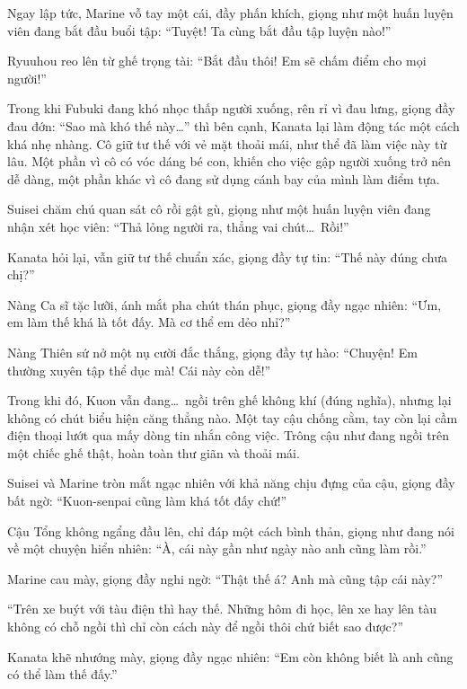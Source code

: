 \documentclass[../main.tex]{subfiles}
\begin{document}
Ngay lập tức, Marine vỗ tay một cái, đầy phấn khích, giọng như một huấn luyện viên đang bắt đầu buổi tập: ``Tuyệt! Ta cùng bắt đầu tập luyện nào!''

Ryuuhou reo lên từ ghế trọng tài: ``Bắt đầu thôi! Em sẽ chấm điểm cho mọi người!''

\ct

Trong khi Fubuki đang khó nhọc thấp người xuống, rên rỉ vì đau lưng, giọng đầy đau đớn: ``Sao mà khó thế này\dots'' thì bên cạnh, Kanata lại làm động tác một cách khá nhẹ nhàng. Cô giữ tư thế với vẻ mặt thoải mái, như thể đã làm việc này từ lâu. Một phần vì cô có vóc dáng bé con, khiến cho việc gập người xuống trở nên dễ dàng, một phần khác vì cô đang sử dụng cánh bay của mình làm điểm tựa.


Suisei chăm chú quan sát cô rồi gật gù, giọng như một huấn luyện viên đang nhận xét học viên: ``Thả lỏng người ra, thẳng vai chút\dots\ Rồi!''

Kanata hỏi lại, vẫn giữ tư thế chuẩn xác, giọng đầy tự tin: ``Thế này đúng chưa chị?''

Nàng Ca sĩ tặc lưỡi, ánh mắt pha chút thán phục, giọng đầy ngạc nhiên: ``Ưm, em làm thế khá là tốt đấy. Mà cơ thể em dẻo nhỉ?''

Nàng Thiên sứ nở một nụ cười đắc thắng, giọng đầy tự hào: ``Chuyện! Em thường xuyên tập thể dục mà! Cái này còn dễ!''

Trong khi đó, Kuon vẫn đang\dots\ ngồi trên ghế không khí (đúng nghĩa), nhưng lại không có chút biểu hiện căng thẳng nào. Một tay cậu chống cằm, tay còn lại cầm điện thoại lướt qua mấy dòng tin nhắn công việc. Trông cậu như đang ngồi trên một chiếc ghế thật, hoàn toàn thư giãn và thoải mái.

Suisei và Marine tròn mắt ngạc nhiên với khả năng chịu đựng của cậu, giọng đầy bất ngờ: ``Kuon-senpai cũng làm khá tốt đấy chứ!''

Cậu Tổng không ngẩng đầu lên, chỉ đáp một cách bình thản, giọng như đang nói về một chuyện hiển nhiên: ``À, cái này gần như ngày nào anh cũng làm rồi.''

Marine cau mày, giọng đầy nghi ngờ: ``Thật thế á? Anh mà cũng tập cái này?''

``Trên xe buýt với tàu điện thì hay thế. Những hôm đi học, lên xe hay lên tàu không có chỗ ngồi thì chỉ còn cách này để ngồi thôi chứ biết sao được?''

Kanata khẽ nhướng mày, giọng đầy ngạc nhiên: ``Em còn không biết là anh cũng có thể làm thế đấy.''
\end{document}
